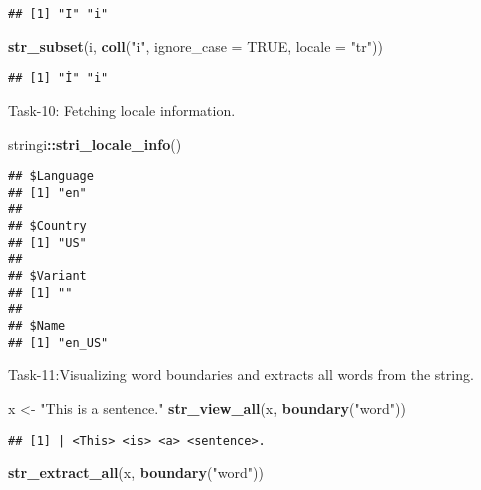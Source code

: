\documentclass[
]{article}
\newenvironment{Shaded}{\begin{snugshade}}{\end{snugshade}}
\newcommand{\AttributeTok}[1]{\textcolor[rgb]{0.13,0.29,0.53}{#1}}
\newcommand{\ConstantTok}[1]{\textcolor[rgb]{0.56,0.35,0.01}{#1}}
\newcommand{\FunctionTok}[1]{\textcolor[rgb]{0.13,0.29,0.53}{\textbf{#1}}}
\newcommand{\NormalTok}[1]{#1}
\newcommand{\OtherTok}[1]{\textcolor[rgb]{0.56,0.35,0.01}{#1}}
\newcommand{\SpecialCharTok}[1]{\textcolor[rgb]{0.81,0.36,0.00}{\textbf{#1}}}
\newcommand{\StringTok}[1]{\textcolor[rgb]{0.31,0.60,0.02}{#1}}
\begin{document}
\begin{verbatim}
## [1] "I" "i"
\end{verbatim}

\begin{Shaded}
\begin{Highlighting}[]
\FunctionTok{str\_subset}\NormalTok{(i, }\FunctionTok{coll}\NormalTok{(}\StringTok{"i"}\NormalTok{, }\AttributeTok{ignore\_case =} \ConstantTok{TRUE}\NormalTok{, }\AttributeTok{locale =} \StringTok{"tr"}\NormalTok{))}
\end{Highlighting}
\end{Shaded}

\begin{verbatim}
## [1] "İ" "i"
\end{verbatim}

Task-10: Fetching locale information.

\begin{Shaded}
\begin{Highlighting}[]
\NormalTok{stringi}\SpecialCharTok{::}\FunctionTok{stri\_locale\_info}\NormalTok{()}
\end{Highlighting}
\end{Shaded}

\begin{verbatim}
## $Language
## [1] "en"
## 
## $Country
## [1] "US"
## 
## $Variant
## [1] ""
## 
## $Name
## [1] "en_US"
\end{verbatim}

Task-11:Visualizing word boundaries and extracts all words from the
string.

\begin{Shaded}
\begin{Highlighting}[]
\NormalTok{x }\OtherTok{\textless{}{-}} \StringTok{"This is a sentence."}
\FunctionTok{str\_view\_all}\NormalTok{(x, }\FunctionTok{boundary}\NormalTok{(}\StringTok{"word"}\NormalTok{))}
\end{Highlighting}
\end{Shaded}

\begin{verbatim}
## [1] | <This> <is> <a> <sentence>.
\end{verbatim}

\begin{Shaded}
\begin{Highlighting}[]
\FunctionTok{str\_extract\_all}\NormalTok{(x, }\FunctionTok{boundary}\NormalTok{(}\StringTok{"word"}\NormalTok{))}
\end{Highlighting}
\end{Shaded}
\end{document}
